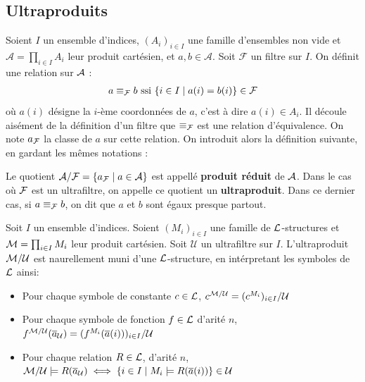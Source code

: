 \subsection{Ultraproduits}

\noindent Soient $I$ un ensemble d'indices, $(A_i)_{i \in I}$ une famille d'ensembles non vide et $\mathcal{A} = \prod_{i \in I} A_i$ leur produit cartésien,
et $a,b \in \mathcal{A}$. Soit $\mathcal{F}$ un filtre sur $I$. On définit une relation sur $\mathcal{A}$ :
\begin{align*}
a \equiv_{\mathcal{F}} b \text{ ssi } \{ i \in I \mid a(i) = b(i) \} \in \mathcal{F}
\end{align*}
où $a(i)$ désigne la $i$-ème coordonnées de $a$, c'est à dire $a(i) \in A_i$. Il découle aisément de la définition d'un filtre que $\equiv_{\mathcal{F}}$
est une relation d'équivalence. On note $a_{\mathcal{F}}$ la classe de $a$ sur cette relation.
On introduit alors la définition suivante, en gardant les mêmes notations :

\begin{defi}[Ultraproduits]
Le quotient $\mathcal{A} / \mathcal{F} = \{ a_{\mathcal{F}} \mid a \in \mathcal{A} \}$ est appellé \textbf{produit réduit} de $\mathcal{A}$. Dans le cas où $\mathcal{F}$ est un ultrafiltre,
on appelle ce quotient un \textbf{ultraproduit}. Dans ce dernier cas, si $a \equiv_{\mathcal{F}} b$, on dit que $a$ et $b$ sont égaux presque partout.
\end{defi}

\begin{defiprop}
Soit $I$ un ensemble d'indices. Soient $(M_i)_{i \in I}$ une famille de $\mathcal{L}$-structures et $\mathcal{M} = \prod_{i \in I} M_i$ leur produit cartésien.
Soit $\mathcal{U}$ un ultrafiltre sur $I$. L'ultraproduit $\mathcal{M}/\mathcal{U}$ est naurellement muni d'une $\mathcal{L}$-structure, en intérpretant les symboles de $\mathcal{L}$ ainsi:
\begin{itemize}
\item Pour chaque symbole de constante $c \in \mathcal{L}$, $c^{\mathcal{M}/\mathcal{U}} = (c^{M_i})_{i \in I}/\mathcal{U}$
\item Pour chaque symbole de fonction $f \in \mathcal{L}$ d'arité $n$, $f^{\mathcal{M}/\mathcal{U}}(\overline{a}_{\mathcal{U}}) = (f^{M_i}(\overline{a}(i)))_{i \in I}/\mathcal{U}$
\item Pour chaque relation $R \in \mathcal{L}$, d'arité $n$, $\mathcal{M}/\mathcal{U} \models R(\overline{a}_{\mathcal{U}}) \iff \{ i \in I \mid
M_i \models R(\overline{a}(i))\} \in \mathcal{U}$
\end{itemize}
\end{defiprop}

